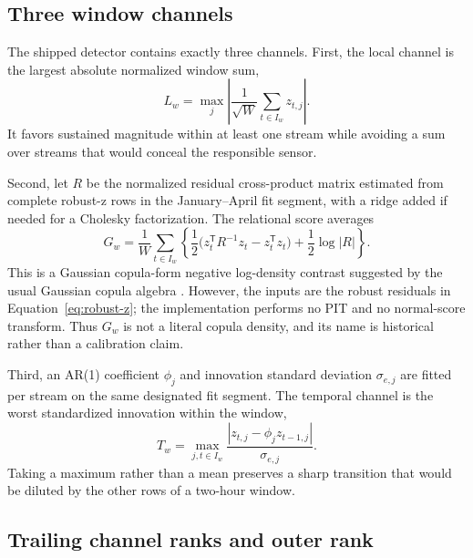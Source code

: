 \subsection{Three window channels}

The shipped detector contains exactly three channels. First, the local channel
is the largest absolute normalized window sum,
\begin{equation}
 L_w=\max_j\left|\frac{1}{\sqrt W}\sum_{t\in I_w}z_{t,j}\right|.
 \label{eq:local}
\end{equation}
It favors sustained magnitude within at least one stream while avoiding a sum
over streams that would conceal the responsible sensor.

Second, let $R$ be the normalized residual cross-product matrix estimated from
complete robust-z rows in the January--April fit segment, with a ridge added if
needed for a Cholesky factorization. The relational score averages
\begin{equation}
 G_w=\frac{1}{W}\sum_{t\in I_w}
 \left\{\frac12\bigl(z_t^{\mathsf T}R^{-1}z_t-z_t^{\mathsf T}z_t\bigr)
       +\frac12\log|R|\right\}.
 \label{eq:relation}
\end{equation}
This is a Gaussian copula-form negative log-density contrast suggested by the
usual Gaussian copula algebra \citep{sklar1959fonctions,song2000gaussiancopula}.
However, the inputs are the robust residuals in
Equation~\eqref{eq:robust-z}; the implementation performs no PIT and no
normal-score transform. Thus $G_w$ is not a literal copula density, and its
name is historical rather than a calibration claim.

Third, an AR(1) coefficient $\phi_j$ and innovation standard deviation
$\sigma_{e,j}$ are fitted per stream on the same designated fit segment. The
temporal channel is the worst standardized innovation within the window,
\begin{equation}
 T_w=\max_{j,t\in I_w}
 \frac{|z_{t,j}-\phi_jz_{t-1,j}|}{\sigma_{e,j}}.
 \label{eq:temporal}
\end{equation}
Taking a maximum rather than a mean preserves a sharp transition that would be
diluted by the other rows of a two-hour window.

\subsection{Trailing channel ranks and outer rank}

